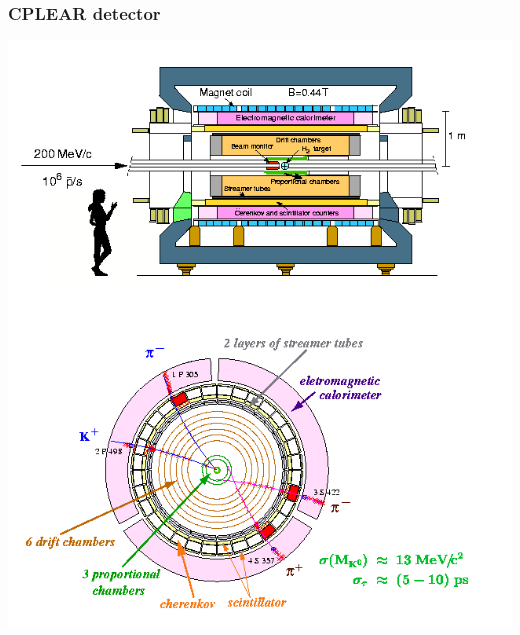 \documentclass[11pt]{article}
\begin{document}
\subsubsection{CPLEAR detector}
\begin{center}
  \includegraphics[height=0.7\textwidth,rotate=90]{figs/cplear.png}
\end{center}
\end{document}
